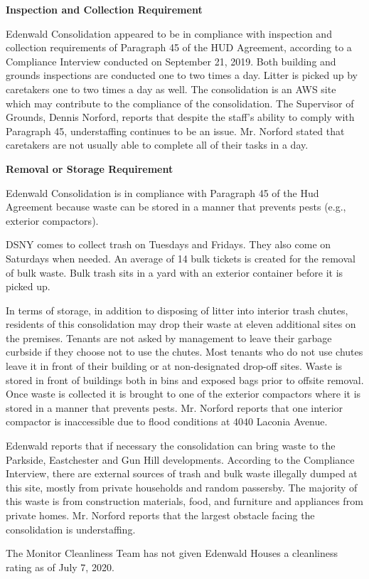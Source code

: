 

\textbf{Inspection and Collection Requirement}

Edenwald Consolidation appeared to be in compliance with inspection and collection requirements of Paragraph 45 of the HUD Agreement, according to a Compliance Interview conducted on September 21, 2019. Both building and grounds inspections are conducted one to two times a day. Litter is picked up by caretakers one to two times a day as well. The consolidation is an AWS site which may contribute to the compliance of the consolidation. The Supervisor of Grounds, Dennis Norford, reports that despite the staff's ability to comply with Paragraph 45, understaffing continues to be an issue. Mr. Norford stated that caretakers are not usually able to complete all of their tasks in a day.  

\textbf{Removal or Storage Requirement}

Edenwald Consolidation is in compliance with Paragraph 45 of the Hud Agreement because waste can be stored in a manner that prevents pests (e.g., exterior compactors).

DSNY comes to collect trash on Tuesdays and Fridays. They also come on Saturdays when needed. An average of 14 bulk tickets is created for the removal of bulk waste. Bulk trash sits in a yard with an exterior container before it is picked up.

In terms of storage, in addition to disposing of litter into interior trash chutes, residents of this consolidation may drop their waste at eleven additional sites on the premises. Tenants are not asked by management to leave their garbage curbside if they choose not to use the chutes. Most tenants who do not use chutes leave it in front of their building or at non-designated drop-off sites. Waste is stored in front of buildings both in bins and exposed bags prior to offsite removal. Once waste is collected it is brought to one of the exterior compactors where it is stored in a manner that prevents pests. Mr. Norford reports that one interior compactor is inaccessible due to flood conditions at 4040 Laconia Avenue.

Edenwald reports that if necessary the consolidation can bring waste to the Parkside, Eastchester and Gun Hill developments. According to the Compliance Interview, there are external sources of trash and bulk waste illegally dumped at this site, mostly from private households and random passersby. The majority of this waste is from construction materials, food, and furniture and appliances from private homes. Mr. Norford reports that the largest obstacle facing the consolidation is understaffing. 

The Monitor Cleanliness Team has not given Edenwald Houses a cleanliness rating as of July 7, 2020. 